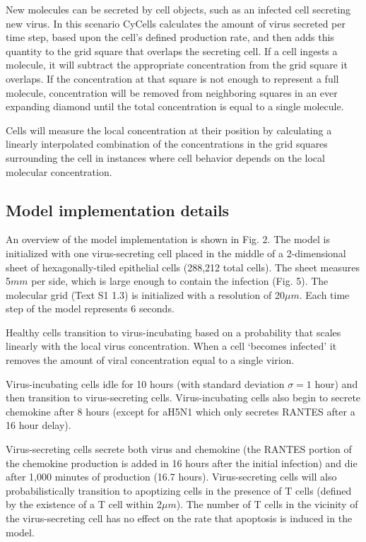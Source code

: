 \documentclass[10pt]{article}
\begin{document}
New molecules can be secreted by cell objects, such as an infected cell secreting new virus.  In this scenario CyCells calculates the amount of virus secreted per time step, based upon the cell's defined production rate, and then adds this quantity to the grid square that overlaps the secreting cell.  If a cell ingests a molecule, it will subtract the appropriate concentration from the grid square it overlaps.  If the concentration at that square is not enough to represent a full molecule, concentration will be removed from neighboring squares in an ever expanding diamond until the total concentration is equal to a single molecule.

Cells will measure the local concentration at their position by calculating a linearly interpolated combination of the concentrations in the grid squares surrounding the cell in instances where cell behavior depends on the local molecular concentration.


\subsection{Model implementation details}

An overview of the model implementation is shown in Fig. 2.  The model is initialized with one virus-secreting cell placed in the middle of a 2-dimensional sheet of hexagonally-tiled epithelial cells (288,212 total cells).  The sheet measures 5$mm$ per side, which is large enough to contain the infection (Fig. 5).  The molecular grid (Text S1 1.3) is initialized with a resolution of 20$\mu m$.  Each time step of the model represents 6 seconds.

Healthy cells transition to virus-incubating based on a probability that scales linearly with the local virus concentration.   When a cell `becomes infected' it removes the amount of viral concentration equal to a single virion. 

Virus-incubating cells idle for 10 hours (with standard deviation $\sigma=1$ hour) and then transition to virus-secreting cells.  Virus-incubating cells also begin to secrete chemokine after 8 hours (except for aH5N1 which only secretes RANTES after a 16 hour delay).  

Virus-secreting cells secrete both virus and chemokine (the RANTES portion of the chemokine production is added in 16 hours after the initial infection) and die after 1,000 minutes of production (16.7 hours).  Virus-secreting cells will also probabilistically transition to apoptizing cells in the presence of T cells (defined by the existence of a T cell within 2$\mu m$).  The number of T cells in the vicinity of the virus-secreting cell has no effect on the rate that apoptosis is induced in the model.
\end{document}
